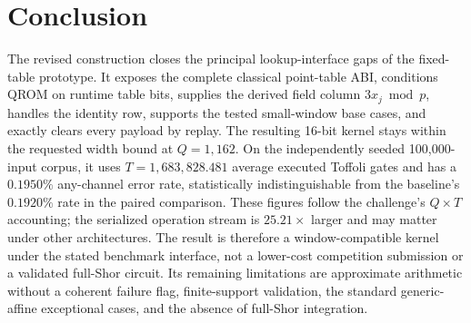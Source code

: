 \documentclass[10pt]{article}
\begin{document}
\section{Conclusion}

The revised construction closes the principal lookup-interface gaps of the fixed-table prototype. It exposes the complete classical point-table ABI, conditions QROM on runtime table bits, supplies the derived field column $3x_j\bmod p$, handles the identity row, supports the tested small-window base cases, and exactly clears every payload by replay. The resulting 16-bit kernel stays within the requested width bound at $Q=1{,}162$. On the independently seeded 100,000-input corpus, it uses $T=1{,}683{,}828.481$ average executed Toffoli gates and has a $0.1950\%$ any-channel error rate, statistically indistinguishable from the baseline's $0.1920\%$ rate in the paired comparison. These figures follow the challenge's $Q\times T$ accounting; the serialized operation stream is $25.21\times$ larger and may matter under other architectures. The result is therefore a window-compatible kernel under the stated benchmark interface, not a lower-cost competition submission or a validated full-Shor circuit. Its remaining limitations are approximate arithmetic without a coherent failure flag, finite-support validation, the standard generic-affine exceptional cases, and the absence of full-Shor integration.
\end{document}
